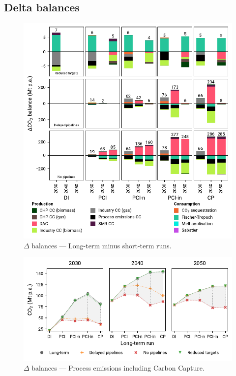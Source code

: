 \documentclass[preprint,12pt,sort&compress]{elsarticle}
\begin{document}
\subsection{Delta balances}
\begin{figure}[htbp]
  \centering
  \includegraphics[width=\textwidth]{balances_overview_extended_co2 stored}
  \caption{$\Delta$ balances --- Long-term minus short-term runs.}
  \label{fig:balances_overview_extended_co2_stored}
\end{figure}
\begin{figure}[htbp]
  \centering
  \includegraphics[width=\textwidth]{delta_balances_process emissions CC}
  \caption{$\Delta$ balances --- Process emissions including Carbon Capture.}
  \label{fig:delta_balances_process_emissions_CC}
\end{figure}
\end{document}
